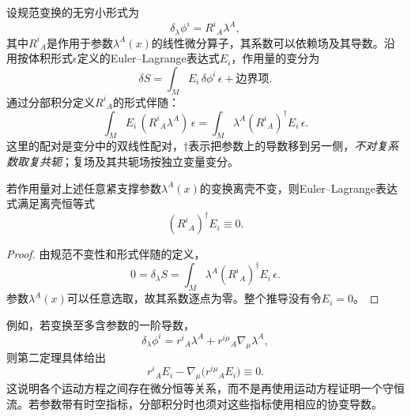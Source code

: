 设规范变换的无穷小形式为
\begin{equation}
    \delta_\lambda\phi^i=R^i{}_A\lambda^A,
\end{equation}
其中$R^i{}_A$是作用于参数$\lambda^A(x)$的线性微分算子，其系数可以依赖场及其导数。沿用按体积形式$\epsilon$定义的Euler--Lagrange表达式$E_i$，作用量的变分为
\begin{equation}
    \delta S=\int_M E_i\,\delta\phi^i\,\epsilon+\text{边界项}.
\end{equation}
通过分部积分定义$R^i{}_A$的形式伴随：
\begin{equation}
    \int_M E_i\,(R^i{}_A\lambda^A)\,\epsilon
    =\int_M\lambda^A(R^i{}_A)^\dagger E_i\,\epsilon.
\end{equation}
这里的配对是变分中的双线性配对，$\dagger$表示把参数上的导数移到另一侧，\emph{不对复系数取复共轭}；复场及其共轭场按独立变量变分。

\begin{theorem}[第二Noether定理]
    若作用量对上述任意紧支撑参数$\lambda^A(x)$的变换离壳不变，则Euler--Lagrange表达式满足离壳恒等式
    \begin{equation}
        \boxed{(R^i{}_A)^\dagger E_i\equiv0.}
        \label{eq:noether-second-identity}
    \end{equation}
\end{theorem}
\begin{proof}
    由规范不变性和形式伴随的定义，
    \begin{equation}
        0=\delta_\lambda S
        =\int_M\lambda^A(R^i{}_A)^\dagger E_i\,\epsilon.
    \end{equation}
    参数$\lambda^A(x)$可以任意选取，故其系数逐点为零。整个推导没有令$E_i=0$。
\end{proof}

例如，若变换至多含参数的一阶导数，
\begin{equation}
    \delta_\lambda\phi^i
    =r^i{}_A\lambda^A+r^{i\mu}{}_A\nabla_{\mu}\lambda^A,
\end{equation}
则第二定理具体给出
\begin{equation}
    \boxed{r^i{}_AE_i-\nabla_{\mu}\bigl(r^{i\mu}{}_AE_i\bigr)\equiv0.}
\end{equation}
这说明各个运动方程之间存在微分恒等关系，而不是再使用运动方程证明一个守恒流。若参数带有时空指标，分部积分时也须对这些指标使用相应的协变导数。

